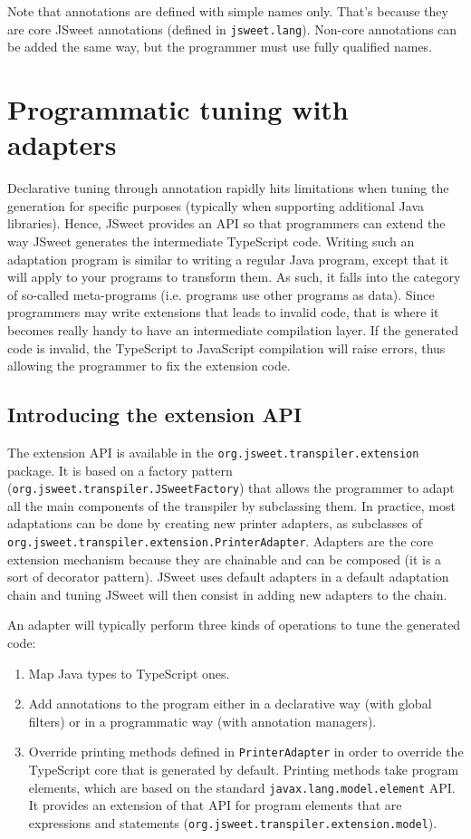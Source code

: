 \documentclass[a4paper]{report}
\begin{document}
Note that annotations are defined with simple names only. That's because they are core JSweet annotations (defined in \texttt{jsweet.lang}). Non-core annotations can be added the same way, but the programmer must use fully qualified names.

\section{Programmatic tuning with adapters}

Declarative tuning through annotation rapidly hits limitations when tuning the generation for specific purposes (typically when supporting additional Java libraries). Hence, JSweet provides an API so that programmers can extend the way JSweet generates the intermediate TypeScript code. Writing such an adaptation program is similar to writing a regular Java program, except that it will apply to your programs to transform them. As such, it falls into the category of so-called meta-programs (i.e. programs use other programs as data). Since programmers may write extensions that leads to invalid code, that is where it becomes really handy to have an intermediate compilation layer. If the generated code is invalid, the TypeScript to JavaScript compilation will raise errors, thus allowing the programmer to fix the extension code.

\subsection{Introducing the extension API}

The extension API is available in the \texttt{org.\-jsweet.\-transpiler.\-extension} package. It is based on a factory pattern (\texttt{org\-.jsweet\-.transpiler\-.JSweetFactory}) that allows the programmer to adapt all the main components of the transpiler by subclassing them. In practice, most adaptations can be done by creating new printer adapters, as subclasses of \texttt{org.\-jsweet.\-transpiler.\-extension.\-PrinterAdapter}. Adapters are the core extension mechanism because they are chainable and can be composed (it is a sort of decorator pattern). JSweet uses default adapters in a default adaptation chain and tuning JSweet will then consist in adding new adapters to the chain.

An adapter will typically perform three kinds of operations to tune the generated code:

\begin{enumerate}
\item Map Java types to TypeScript ones.
\item Add annotations to the program either in a declarative way (with global filters) or in a programmatic way (with annotation managers). 
\item Override printing methods defined in \texttt{PrinterAdapter} in order to override the TypeScript core that is generated by default. Printing methods take program elements, which are based on the standard \texttt{javax\-.lang\-.model\-.element} API. It provides an extension of that API for program elements that are expressions and statements (\texttt{org\-.jsweet\-.transpiler\-.extension\-.model}).
\end{enumerate}
\end{document}
